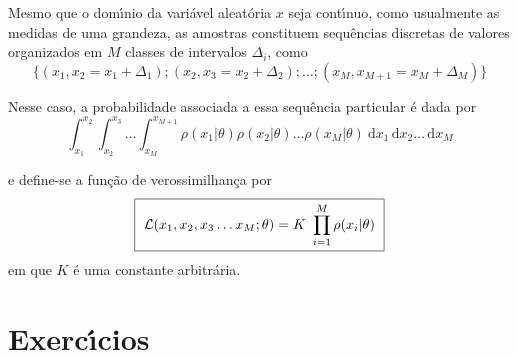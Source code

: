 



\pagebreak
  Mesmo que o dom\'{\i}nio da vari\'{a}vel aleat\'{o}ria $x$ seja cont\'{\i}nuo, como usualmente as medidas de uma grandeza, as amostras constituem sequ\^{e}ncias discretas de valores organizados em $M$ classes de intervalos $\Delta_i$, como
$$ \Big\{ (x_1, x_2 = x_1 + \Delta_1) ;  (x_2, x_3 = x_2 + \Delta_2) ;  \dots  ; (x_M, x_{M+1} = x_M + \Delta_M) \Big\}$$


 Nesse caso, a probabilidade associada a essa sequ\^{e}ncia particular  \'{e}  dada por
$$  \int_{x_1}^{x_2} \int_{x_2}^{x_3} \! \ldots  \int_{x_M}^{x_{M + 1}} \rho(x_1|\theta) \rho(x_2|\theta) \ldots \rho(x_M|\theta) \ \mbox{d}x_1 \, \mbox{d}x_2  \ldots \, \mbox{d}x_M $$

 e define-se a fun\c{c}\~{a}o de verossimilhan\c{c}a por
\begin{equation}
 \label{vero2}
\fbox{~$\displaystyle  {\cal L} (x_1, x_2, x_3 \dots  x_M; \theta)  = K \ \prod_{i=1}^{M} \rho(x_i|\theta)
$~}
 \end{equation}
em que $K$ \'{e} uma constante arbitr\'{a}ria.
\newpage
\section{Exerc\'{\i}cios}
\label{exerc_likeli}

